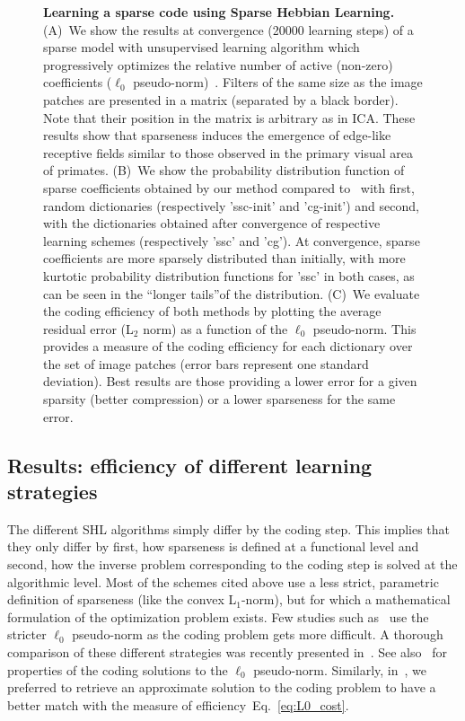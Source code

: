 \documentclass[a4paper, 11pt]{book}
\newcommand{\seeEq}[1]{Eq.~\ref{eq:#1}}%
\begin{document}
\begin{figure}
\caption{ {\bf Learning a sparse code using Sparse Hebbian Learning.}  \textsf{(A)}~We show the results  at convergence (20000 learning steps) of a sparse model with unsupervised learning algorithm which progressively optimizes the relative number of active (non-zero) coefficients ($\ell_0$ pseudo-norm)~\citep{Perrinet10shl}. Filters of the same size as the image patches are presented in a matrix (separated by a black border). Note that their position in the matrix is arbitrary as in ICA. These results show that sparseness induces the emergence of edge-like receptive fields similar to those observed in the primary visual area of primates. \textsf{(B)}~We show the probability distribution function of sparse coefficients obtained by our method compared to~\citep{Olshausen96} with first, random dictionaries (respectively 'ssc-init' and 'cg-init') and second, with the dictionaries obtained after convergence of respective learning schemes (respectively 'ssc' and 'cg'). At convergence, sparse coefficients are more sparsely distributed than initially, with more kurtotic probability distribution functions for {\sf 'ssc'} in both cases, as can be seen in the ``longer tails''of the distribution. \textsf{(C)}~We evaluate the coding efficiency of both methods by plotting the average residual error (L$_2$ norm) as a function of the $\ell_0$ pseudo-norm. This provides a measure of the coding efficiency for each dictionary over the set of image patches (error bars represent one standard deviation). Best results are those providing a lower error for a given sparsity (better compression) or a lower sparseness for the same error. %
\label{fig:sparsenet}}%
\end{figure}%
\subsection{Results: efficiency of different learning strategies}
The different SHL algorithms simply differ by the coding step.
This implies that they only differ by first, how sparseness is defined at a functional level and second, how the inverse problem corresponding to the coding step is solved at the algorithmic level.
Most of the schemes cited above use a less strict, parametric definition of sparseness (like the convex L$_1$-norm), but for which a mathematical formulation of the optimization problem exists.
Few studies such as~\citep{Liu14,Peharz12} use the stricter $\ell_0$ pseudo-norm as the coding problem gets more difficult.
A thorough comparison of these different strategies was recently presented in~\citep{Charles12}.
See also~\citep{Aharon06} for properties of the coding solutions to the $\ell_0$ pseudo-norm.
Similarly, in~\citep{Perrinet10shl}, we preferred to retrieve an approximate solution to the coding problem to have a better match with the measure of efficiency~\seeEq{L0_cost}. %
\end{document}
